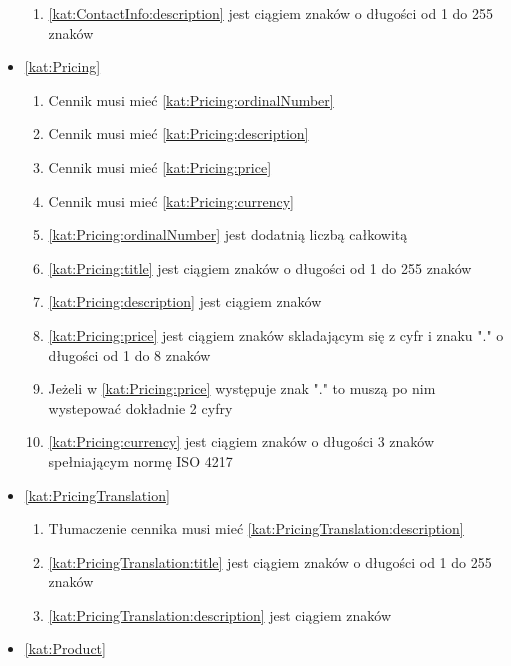 \begin{itemize}[label={\textbf{Ograniczenia dla}}, wide, labelwidth=!, labelindent=0pt]
\begin{enumerate}[label={\textbf{OGR/\protect\threedigits{\arabic{enumi}}}}, wide, labelwidth=!, align=left, leftmargin=3cm, resume]
        \item \ref{kat:ContactInfo:description} jest ciągiem znaków o długości od 1 do 255 znaków
    \end{enumerate}
    \item\ref{kat:Pricing}
    \begin{enumerate}[label={\textbf{OGR/\protect\threedigits{\arabic{enumi}}}}, wide, labelwidth=!, align=left, leftmargin=3cm, resume]
        \item Cennik musi mieć \ref{kat:Pricing:ordinalNumber}
        \item Cennik musi mieć \ref{kat:Pricing:description}
        \item Cennik musi mieć \ref{kat:Pricing:price}
        \item Cennik musi mieć \ref{kat:Pricing:currency}
        \item \ref{kat:Pricing:ordinalNumber} jest dodatnią liczbą całkowitą
        \item \ref{kat:Pricing:title} jest ciągiem znaków o długości od 1 do 255 znaków
        \item \ref{kat:Pricing:description} jest ciągiem znaków
        \item \ref{kat:Pricing:price} jest ciągiem znaków skladającym się z cyfr i znaku "." o długości od 1 do 8 znaków
        \item Jeżeli w \ref{kat:Pricing:price} występuje znak "." to muszą po nim wystepować dokładnie 2 cyfry
        \item \ref{kat:Pricing:currency} jest ciągiem znaków o długości 3 znaków spełniającym normę ISO 4217
    \end{enumerate}
    \item\ref{kat:PricingTranslation}
    \begin{enumerate}[label={\textbf{OGR/\protect\threedigits{\arabic{enumi}}}}, wide, labelwidth=!, align=left, leftmargin=3cm, resume]
        \item Tłumaczenie cennika musi mieć \ref{kat:PricingTranslation:description}
        \item \ref{kat:PricingTranslation:title} jest ciągiem znaków o długości od 1 do 255 znaków
        \item \ref{kat:PricingTranslation:description} jest ciągiem znaków
    \end{enumerate}
    \item\ref{kat:Product}
    \begin{enumerate}[label={\textbf{OGR/\protect\threedigits{\arabic{enumi}}}}, wide, labelwidth=!, align=left, leftmargin=3cm, resume]

\end{enumerate}
\end{itemize}
